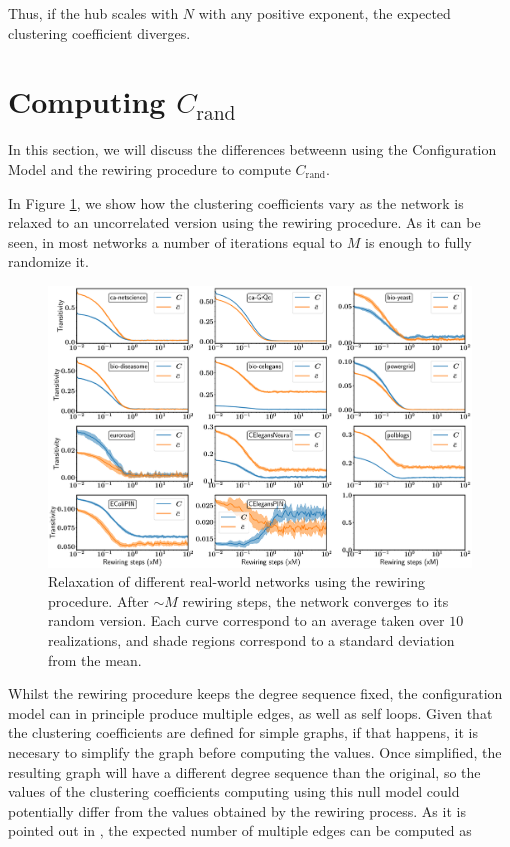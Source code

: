 \documentclass{article}
\begin{document}
Thus, if the hub scales with $N$ with any positive exponent, the expected clustering coefficient diverges.

\section{Computing $C_{\mathrm{rand}}$}

In this section, we will discuss the differences betweenn using the Configuration Model and the rewiring procedure to compute $C_{\mathrm{rand}}$.

In Figure \ref{fig:relaxation}, we show how the clustering coefficients vary as the network is relaxed to an uncorrelated version using the rewiring procedure. As it can be seen, in most networks a number of iterations equal to $M$ is enough to fully randomize it. 

\begin{figure}[ht!]
\centering
\includegraphics[scale=0.26]{./figs/relaxation.pdf}
\caption{Relaxation of different real-world networks using the rewiring procedure. After $\sim M$ rewiring steps, the network converges to its random version. Each curve correspond to an average taken over $10$ realizations, and shade regions correspond to a standard deviation from the mean.}
\label{fig:relaxation}
\end{figure}

Whilst the rewiring procedure keeps the degree sequence fixed, the configuration model can in principle produce multiple edges, as well as self loops. Given that the clustering coefficients are defined for simple graphs, if that happens, it is necesary to simplify the graph before computing the values. Once simplified, the resulting graph will have a different degree sequence than the original, so the values of the clustering coefficients computing using this null model could potentially differ from the values obtained by the rewiring process. As it is pointed out in \cite{NewmanBook}, the expected number of multiple edges can be computed as
\end{document}
